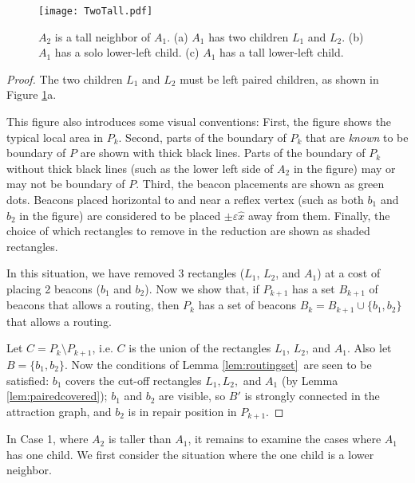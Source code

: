 \documentclass{article}
\begin{document}
		\begin{figure}[htbp] 
			\begin{center}
				\texttt{[image: TwoTall.pdf]} 
			\end{center}
			\caption{
				$A_2$ is a tall neighbor of $A_1$.
				(a) $A_1$ has two children $L_1$ and $L_2$. 
				(b) $A_1$ has a solo lower-left child. 
				(c) $A_1$ has a tall lower-left child.
			}
			\label{fig:twotall}
		\end{figure}
		
		\begin{proof}
			The two children $L_1$ and $L_2$ must be left paired
			children, as shown in Figure \ref{fig:twotall}a.

			This figure also introduces some visual conventions: 
			First, the figure shows the typical local area in $P_k$.
			Second, parts of the boundary of $P_k$ that are \emph{known} to be boundary of
			$P$ are shown with thick black lines.  Parts of the boundary of $P_k$ without
			thick black lines (such as the lower left side of $A_2$ in the figure) may or may not
			be boundary of $P$.
			Third, the beacon placements are shown as green dots.  Beacons placed
			horizontal to and near a reflex vertex (such as both $b_1$ and $b_2$ in the figure) are considered to be placed
			$\pm\varepsilon\hat{x}$ away from them.
			Finally, the choice of which
			rectangles to remove in the reduction are shown as shaded rectangles.

			In this situation,
			we have removed 3 rectangles ($L_1$, $L_2$, and $A_1$) at a cost of placing 2
			beacons ($b_1$ and $b_2$).
			Now we show that, if $P_{k+1}$ has a set $B_{k+1}$ of beacons that allows a
			routing, then $P_k$ has a set of beacons $B_{k} = B_{k+1} \cup \{ b_1, b_2 \}$
			that allows a routing.
 
			Let $C = P_{k} \setminus P_{k+1}$, i.e. $C$ is the union of the
			rectangles $L_1$, $L_2$, and $A_1$.  Also let $B = \{ b_1, b_2 \}$.
			Now the conditions of Lemma \ref{lem:routingset}\ are seen to be satisfied:
			$b_1$ covers the cut-off rectangles $L_1, L_2,$ and $A_1$ (by Lemma
			\ref{lem:pairedcovered}); $b_1$ and $b_2$ are visible, so $B'$ is strongly
			connected in the attraction graph, and $b_2$ is in repair position
			in $P_{k+1}$.
		\end{proof}

		In Case 1, where $A_2$ is taller than $A_1$, it remains to examine the cases
		where $A_1$ has one child.
		We first consider the situation where the one child is a lower neighbor.
\end{document}
